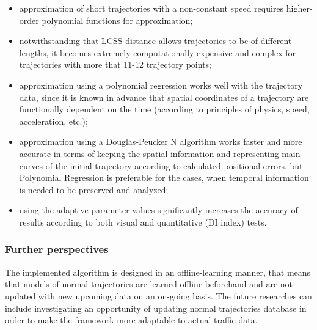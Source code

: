 \begin{itemize}
	\setlength\itemsep{0em}	
	\item approximation of short trajectories with a non-constant speed requires higher-order polynomial functions for approximation;
	\item notwithstanding that LCSS distance allows trajectories to be of different lengths, it becomes extremely computationally expensive and complex for trajectories with more that 11-12 trajectory points;
	\item approximation using a polynomial regression works well with the trajectory data, since it is known in advance that spatial coordinates of a trajectory are functionally dependent on the time (according to principles of physics, speed, acceleration, etc.);
	\item approximation using a Douglas-Peucker N algorithm works faster and more accurate in terms of keeping the spatial information and representing main curves of the initial trajectory according to calculated positional errors, but Polynomial Regression is preferable for the cases, when temporal information is needed to be preserved and analyzed;
	\item using the adaptive parameter values significantly increases the accuracy of results according to both visual and quantitative (DI index) tests.
\end{itemize}

\bigbreak

\subsubsection{Further perspectives}

The implemented algorithm is designed in an offline-learning manner, that means that models of normal trajectories are learned offline beforehand and are not updated with new upcoming data on an on-going basis. The future researches can include investigating an opportunity of updating normal trajectories database in order to make the framework more adaptable to actual traffic data.
